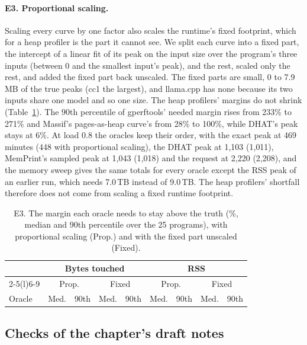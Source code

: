 \documentclass[11pt]{article}
\newcommand{\tabinput}[1]{}
\newcommand{\memprint}{MemPrint}
\begin{document}
\paragraph{E3. Proportional scaling.} Scaling every curve by one factor also scales the runtime's fixed footprint,
which for a heap profiler is the part it cannot see. We split each curve into a fixed part, the intercept of a linear
fit of its peak on the input size over the program's three inputs (between 0 and the smallest input's peak), and the
rest, scaled only the rest, and added the fixed part back unscaled. The fixed parts are small, 0 to 7.9\,MB of the
true peaks (cc1 the largest), and llama.cpp has none because its two inputs share one model and so one size. The
heap profilers' margins do not shrink (Table~\ref{tab:motive3}). The 90th percentile of gperftools' needed margin
rises from 233\% to 271\% and Massif's pages-as-heap curve's from 28\% to 100\%, while DHAT's peak stays at 6\%. At
load 0.8 the oracles keep their order, with the exact peak at 469 minutes (448 with proportional scaling), the DHAT
peak at 1{,}103 (1{,}011), \memprint{}'s sampled peak at 1{,}043 (1{,}018) and the request at 2{,}220 (2{,}208), and the memory sweep gives the same totals for every
oracle except the RSS peak of an earlier run, which needs 7.0\,TB instead of 9.0\,TB. The heap profilers' shortfall
therefore does not come from scaling a fixed runtime footprint.

\begin{table}[htbp]
\centering
\caption{E3. The margin each oracle needs to stay above the truth (\%, median and 90th percentile over the 25 programs),
with proportional scaling (Prop.) and with the fixed part unscaled (Fixed).}
\label{tab:motive3}
\footnotesize
\begin{tabular}{@{}lrrrrrrrr@{}}
\toprule
& \multicolumn{4}{c}{Bytes touched} & \multicolumn{4}{c}{RSS} \\
\cmidrule(lr){2-5}\cmidrule(l){6-9}
& \multicolumn{2}{c}{Prop.} & \multicolumn{2}{c}{Fixed} & \multicolumn{2}{c}{Prop.} & \multicolumn{2}{c}{Fixed} \\
Oracle & Med. & 90th & Med. & 90th & Med. & 90th & Med. & 90th \\
\midrule
\tabinput{motiv_e3_margins}
\bottomrule
\end{tabular}
\end{table}

\subsection{Checks of the chapter's draft notes}
\label{sec:draftchecks}
\end{document}
